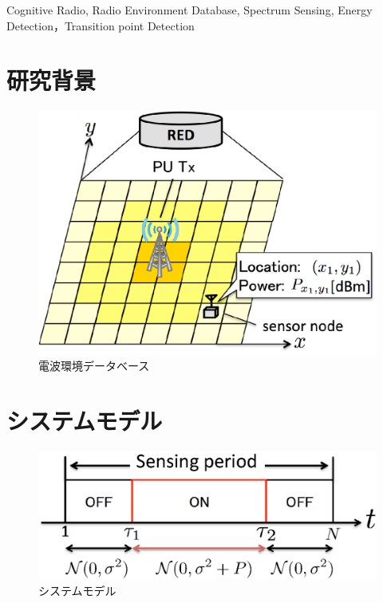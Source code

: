 \documentclass[technicalreport]{ieicej}
\begin{document}
\begin{ekeyword}
Cognitive Radio, Radio Environment Database, Spectrum Sensing, Energy Detection，Transition point Detection
\end{ekeyword}
\maketitle

\section{研究背景}

\begin{figure}[t]
  \centering
  \includegraphics[width=0.8\hsize,clip]{database.eps}
  \caption{電波環境データベース}
  \label{databse}
\end{figure}



\section{システムモデル}
\label{sec:model}
\begin{figure}[t]
\centering
\includegraphics[width=0.8\hsize,clip]{systemmodel.eps}
\caption{\normalsize{システムモデル}}
\label{systemmodel}
\end{figure}
\end{document}
